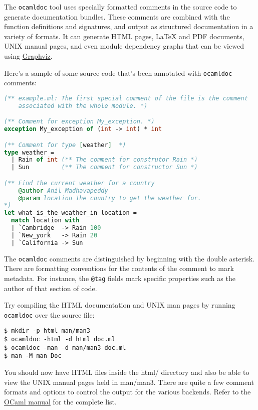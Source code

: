 The \passthrough{\lstinline!ocamldoc!} tool uses specially formatted
comments in the source code to generate documentation bundles. These
comments are combined with the function definitions and signatures, and
output as structured documentation in a variety of formats. It can
generate HTML pages, LaTeX and PDF documents, UNIX manual pages, and
even module dependency graphs that can be viewed using
\href{http://www.graphviz.org}{Graphviz}.

Here's a sample of some source code that's been annotated with
\passthrough{\lstinline!ocamldoc!} comments:

\begin{lstlisting}[language=Caml]
(** example.ml: The first special comment of the file is the comment
    associated with the whole module. *)

(** Comment for exception My_exception. *)
exception My_exception of (int -> int) * int

(** Comment for type [weather]  *)
type weather =
  | Rain of int (** The comment for construtor Rain *)
  | Sun         (** The comment for constructor Sun *)

(** Find the current weather for a country
    @author Anil Madhavapeddy
    @param location The country to get the weather for.
*)
let what_is_the_weather_in location =
  match location with
  | `Cambridge  -> Rain 100
  | `New_york   -> Rain 20
  | `California -> Sun
\end{lstlisting}

The \passthrough{\lstinline!ocamldoc!} comments are distinguished by
beginning with the double asterisk. There are formatting conventions for
the contents of the comment to mark metadata. For instance, the
\passthrough{\lstinline!@tag!} fields mark specific properties such as
the author of that section of code.

Try compiling the HTML documentation and UNIX man pages by running
\passthrough{\lstinline!ocamldoc!} over the source file:

\begin{lstlisting}
$ mkdir -p html man/man3
$ ocamldoc -html -d html doc.ml
$ ocamldoc -man -d man/man3 doc.ml
$ man -M man Doc
\end{lstlisting}

You should now have HTML files inside the html/ directory and also be
able to view the UNIX manual pages held in man/man3. There are quite a
few comment formats and options to control the output for the various
backends. Refer to the
\href{http://caml.inria.fr/pub/docs/manual-ocaml/manual029.html}{OCaml
manual} for the complete
list.~~~

